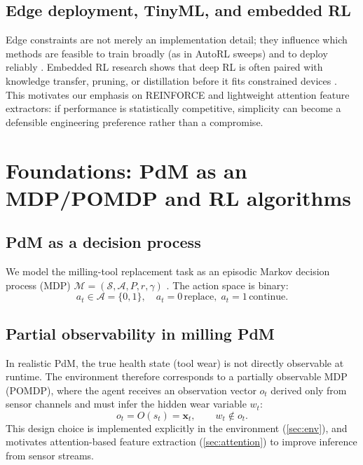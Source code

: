 \documentclass[11pt]{article}
\begin{document}
\subsection{Edge deployment, TinyML, and embedded RL}
Edge constraints are not merely an implementation detail; they influence which methods are feasible to train broadly (as in AutoRL sweeps) and to deploy reliably \parencite{Compare2020IoT, Njor2024TinyML, Pandey2023EdgeDNN}. Embedded RL research shows that deep RL is often paired with knowledge transfer, pruning, or distillation before it fits constrained devices \parencite{Jang2020KnowledgeTransfer, Szydlo2022TinyRL, Xu2022ISORC}. This motivates our emphasis on REINFORCE and lightweight attention feature extractors: if performance is statistically competitive, simplicity can become a defensible engineering preference rather than a compromise.

\section{Foundations: PdM as an MDP/POMDP and RL algorithms}
\label{sec:foundations}
\subsection{PdM as a decision process}
We model the milling-tool replacement task as an episodic Markov decision process (MDP) $\mathcal{M}=(\mathcal{S},\mathcal{A},P,r,\gamma)$ \parencite{SuttonBarto2018}. The action space is binary:
\begin{equation}
	a_t \in \mathcal{A}=\{0,1\}, \quad a_t=0\,\text{replace}, \; a_t=1\,\text{continue}.
\end{equation}

\subsection{Partial observability in milling PdM}
\label{sec:pomdp}
In realistic PdM, the true health state (tool wear) is not directly observable at runtime. The environment therefore corresponds to a partially observable MDP (POMDP), where the agent receives an observation vector $o_t$ derived only from sensor channels and must infer the hidden wear variable $w_t$:
\begin{equation}
	o_t = O(s_t) = \mathbf{x}_t, \qquad w_t \notin o_t.
\end{equation}
This design choice is implemented explicitly in the environment (\cref{sec:env}), and motivates attention-based feature extraction (\cref{sec:attention}) to improve inference from sensor streams.
\end{document}
